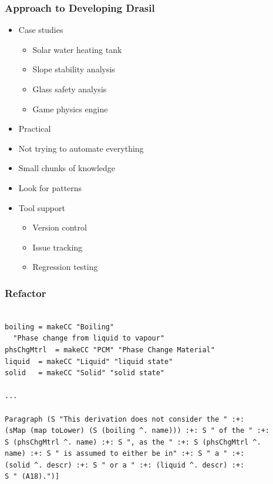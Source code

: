 \documentclass{beamer}
\begin{document}
\hoffset=0in %


\begin{frame}

\frametitle{Approach to Developing Drasil}

\begin{itemize}
\item Case studies
\begin{itemize}
\item Solar water heating tank
\item Slope stability analysis
\item Glass safety analysis
\item Game physics engine
\end{itemize}
\item Practical
\item Not trying to automate everything %
\item Small chunks of knowledge
\item Look for patterns
\item Tool support
\begin{itemize}
\item Version control
\item Issue tracking
\item Regression testing
\end{itemize}
\end{itemize}

\end{frame}


\hoffset=-0.4in %
\begin{frame}

\frametitle{Refactor}

\begin{lstlisting}

boiling = makeCC "Boiling" 
  "Phase change from liquid to vapour"
phsChgMtrl  = makeCC "PCM" "Phase Change Material"
liquid  = makeCC "Liquid" "liquid state"
solid   = makeCC "Solid" "solid state"

...

Paragraph (S "This derivation does not consider the " :+: 
(sMap (map toLower) (S (boiling ^. name))) :+: S " of the " :+: 
S (phsChgMtrl ^. name) :+: S ", as the " :+: S (phsChgMtrl ^. 
name) :+: S " is assumed to either be in" :+: S " a " :+:
(solid ^. descr) :+: S " or a " :+: (liquid ^. descr) :+: 
S " (A18).")]

\end{lstlisting}

\end{frame}
\end{document}
